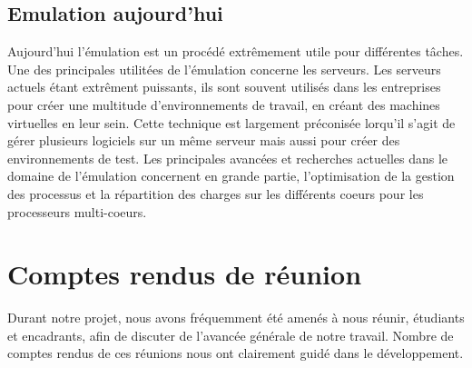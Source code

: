\documentclass[french]{report}
\begin{document}
\section*{Emulation aujourd'hui}
Aujourd'hui l'émulation est un procédé extrêmement utile pour différentes tâches. Une des principales utilitées de l'émulation concerne les serveurs. Les serveurs actuels étant extrêment puissants, ils sont souvent utilisés dans les entreprises pour créer une multitude d'environnements de travail, en créant des machines virtuelles en leur sein. Cette technique est largement préconisée lorqu'il s'agit de gérer plusieurs logiciels sur un même serveur mais aussi pour créer des environnements de test. 
Les principales avancées et recherches actuelles dans le domaine de l'émulation concernent en grande partie, l'optimisation de la gestion des processus et la répartition des charges sur les différents coeurs pour les processeurs multi-coeurs.


\appendix
\chapter{Comptes rendus de réunion}
Durant notre projet, nous avons fréquemment été amenés à nous réunir, étudiants et encadrants, afin de discuter de l'avancée générale de notre travail.
Nombre de comptes rendus de ces réunions nous ont clairement guidé dans le développement.
\end{document}
